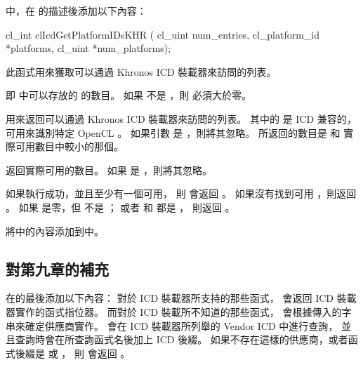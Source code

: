 \insection[queryPlf]中，在  的描述後添加以下內容：
\startreplacepar
{}

\startCLFUNC
cl_int clIcdGetPlatformIDsKHR (
			cl_uint num_entries,
			cl_platform_id *platforms,
			cl_uint *num_platforms);
\stopCLFUNC

此函式用來獲取可以通過 Khronos ICD 裝載器來訪問的列表。

 即  中可以存放的  的數目。
如果  不是 ，則  必須大於零。

 用來返回可以通過 Khronos ICD 裝載器來訪問的列表。
其中的  是 ICD 兼容的，
可用來識別特定 OpenCL 。
如果引數  是 ，則將其忽略。
所返回的數目是  和
實際可用數目中較小的那個。

 返回實際可用的數目。
如果  是 ，則將其忽略。

如果執行成功，並且至少有一個可用，
則  會返回 。
如果沒有找到可用 ，則返回 。
如果  是零，但  不是 ；
或者  和  都是 ，
則返回 。
\stopreplacepar

將中的內容添加到中。

{}

\subsection{對第九章的補充}

在\insection[getFuncPtr]的最後添加以下內容：
\startreplacepar
對於 ICD 裝載器所支持的那些函式，
  會返回 ICD 裝載器實作的函式指位器。
而對於 ICD 裝載所不知道的那些函式，
  會根據傳入的字串來確定供應商實作。
  會在 ICD 裝載器所列舉的 Vendor ICD 中進行查詢，
並且查詢時會在所查詢函式名後加上 ICD 後綴。
如果不存在這樣的供應商，或者函式後綴是  或 ，
則  會返回 。
\stopreplacepar

